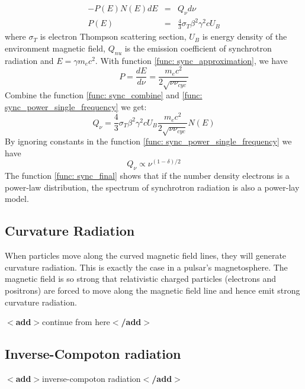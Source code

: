 \documentclass[12pt]{report}
\newcommand{\add}[1]{
  $<$\textbf{add}$>$#1$<$\textbf{/add}$>$
}
\begin{document}
          \begin{eqnarray}
            \label{func: sync_power_single_frequency}
            -P\left(E\right)N\left(E\right)dE &=& Q_{\nu} d\nu\\
            P\left(E\right) &=& \frac{4}{3} \sigma_{T} \beta^2 \gamma^2 c U_B
          \end{eqnarray} 
          where $\sigma_{T}$ is electron Thompson scattering section, $U_B$ is energy density of the environment 
          magnetic field,  $Q_{nu}$ is the emission coefficient of synchrotron radiation 
          and $E=\gamma m_e c^2$. With function \ref{func: sync_approximation}, we have
          \begin{equation}
            \label{func: sync_combine}
            P = \frac{dE}{d\nu} = \frac{m_e c^2}{2\sqrt{\nu \nu_{cyc}}}
          \end{equation}
          Combine the function \ref{func: sync_combine} and \ref{func: sync_power_single_frequency} we get:
          \begin{equation}
            Q_{\nu} = \frac{4}{3} \sigma_{T} \beta^2 \gamma^2 c U_B \frac{m_e c^2}{2\sqrt{\nu \nu_{cyc}}} N\left(E\right)
          \end{equation}
          By ignoring constants in the function \ref{func: sync_power_single_frequency} we have 
          \begin{equation}
            \label{func: sync_final}
            Q_{\nu} \propto \nu^{(1-\delta)/2}
          \end{equation}
          The function \ref{func: sync_final} shows that if the number density electrons is a power-law distribution, 
          the spectrum of synchrotron radiation is also a power-lay model.  


        \subsection{Curvature Radiation}
          When particles move along the curved magnetic field lines, they will generate curvature radiation. This is 
          exactly the case in a pulsar's magnetosphere. The magnetic field is so strong that relativistic 
          charged particles (electrons and positrons) are forced to move along the magnetic field line and hence 
          emit strong curvature radiation. 
          
          \add{continue from here}

        \subsection{Inverse-Compoton radiation}
          \add{inverse-compoton radiation}
\end{document}
